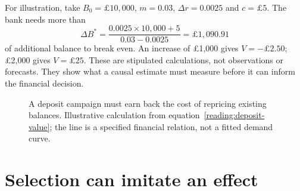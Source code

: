 For illustration, take $B_0=\pounds10{,}000$, $m=0.03$, $\Delta r=0.0025$
and $c=\pounds5$. The bank needs more than
\[
 \Delta B^*=\frac{0.0025\times10{,}000+5}{0.03-0.0025}
 =\pounds1{,}090.91
\]
of additional balance to break even. An increase of \pounds1,000 gives
$V=-\pounds2.50$; \pounds2,000 gives $V=\pounds25$. These are stipulated
calculations, not observations or forecasts. They show what a causal estimate
must measure before it can inform the financial decision.

\begin{figure}[htbp]\centering
{}
\caption{A deposit campaign must earn back the cost of repricing existing
balances. Illustrative calculation from equation~\ref{reading:deposit-value};
the line is a specified financial relation, not a fitted demand curve.}
\label{reading:break-even}
\end{figure}

\section{Selection can imitate an effect}

